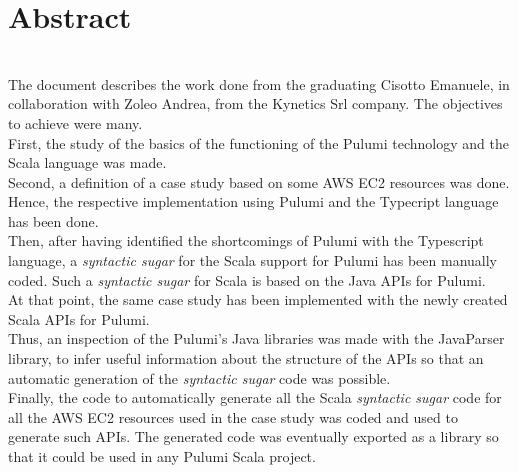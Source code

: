 
{}
{}
\begingroup
\let\clearpage\relax
\let\cleardoublepage\relax
\let\cleardoublepage\relax

\chapter*{Abstract}

\\


The document describes the work done from the graduating Cisotto Emanuele, in collaboration with Zoleo Andrea, from the Kynetics Srl company.
The objectives to achieve were many.\\
First, the study of the basics of the functioning of the Pulumi technology and the Scala language was made.\\
Second, a definition of a case study based on some \gls{AWS} \gls{EC2} resources was done. Hence, the respective implementation using Pulumi and the Typecript language has been done.\\
Then, after having identified the shortcomings of Pulumi with the Typescript language, a \textit{syntactic sugar} for the Scala support for Pulumi has been manually coded.
Such a \textit{syntactic sugar} for Scala is based on the Java APIs for Pulumi.\\
At that point, the same case study has been implemented with the newly created Scala APIs for Pulumi.\\
Thus, an inspection of the Pulumi's Java libraries was made with the \gls{JavaParser} library, to infer useful information about the structure of the APIs so that an automatic generation of the \textit{syntactic sugar} code was possible.\\
Finally, the code to automatically generate all the Scala \textit{syntactic sugar} code for all the AWS EC2 resources used in the case study was coded and used to generate such APIs.
The generated code was eventually exported as a library so that it could be used in any Pulumi Scala project.




%
%

\endgroup			

\vfill

